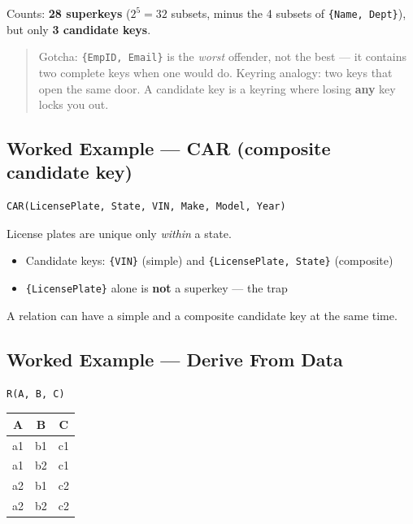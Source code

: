 \documentclass[12pt]{article}
\begin{document}
Counts: \textbf{28 superkeys} ($2^5 = 32$ subsets, minus the 4 subsets of
\texttt{\{Name, Dept\}}), but only \textbf{3 candidate keys}.

\begin{quote}
Gotcha: \texttt{\{EmpID, Email\}} is the \emph{worst} offender, not the best ---
it contains two complete keys when one would do. Keyring analogy: two keys that
open the same door. A candidate key is a keyring where losing \textbf{any} key
locks you out.
\end{quote}

\subsection*{Worked Example --- CAR (composite candidate key)}

\begin{lstlisting}[style=plainschema]
CAR(LicensePlate, State, VIN, Make, Model, Year)
\end{lstlisting}

License plates are unique only \emph{within} a state.

\begin{itemize}
    \item Candidate keys: \texttt{\{VIN\}} (simple) and \texttt{\{LicensePlate, State\}} (composite)
    \item \texttt{\{LicensePlate\}} alone is \textbf{not} a superkey --- the trap
\end{itemize}

A relation can have a simple and a composite candidate key at the same time.

\subsection*{Worked Example --- Derive From Data}

\begin{lstlisting}[style=plainschema]
R(A, B, C)
\end{lstlisting}

\begin{table}[H]
\centering
\begin{tabular}{|c|c|c|}
\hline
\textbf{A} & \textbf{B} & \textbf{C} \\
\hline
a1 & b1 & c1 \\
a1 & b2 & c1 \\
a2 & b1 & c2 \\
a2 & b2 & c2 \\
\hline
\end{tabular}
\end{table}
\end{document}
